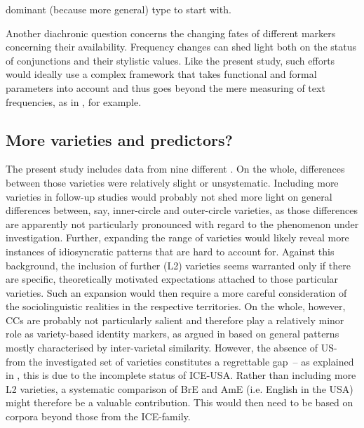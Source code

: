 dominant (because more general) type to start with.\largerpage

Another diachronic question concerns the changing fates of different markers concerning their availability. Frequency changes can shed light both on the  status of conjunctions and their stylistic values. Like the present study, such efforts would ideally use a complex framework that takes functional and formal parameters into account and thus goes beyond the mere measuring of text frequencies, as in \citet[165]{Schützler2018c}, for example.

\subsection{\label{bkm:Ref81829707}More varieties and predictors?}\label{sec:12.2.4}

The present study includes data from nine different . On the whole, differences between those varieties were relatively slight or unsystematic. Including more varieties in follow-up studies would probably not shed more light on general differences between, say, inner-circle and outer-circle varieties, as those differences are apparently not particularly pronounced with regard to the phenomenon under investigation. Further, expanding the range of varieties would likely reveal more instances of idiosyncratic patterns that are hard to account for. Against this background, the inclusion of further (L2) varieties seems warranted only if there are specific, theoretically motivated expectations attached to those particular varieties. Such an expansion would then require a more careful consideration of the sociolinguistic realities in the respective territories. On the whole, however, CCs are probably not particularly salient and therefore play a relatively minor role as variety-based identity markers, as argued in  based on general patterns mostly characterised by inter-varietal similarity. However, the absence of US- from the investigated set of varieties constitutes a regrettable gap~– as explained in , this is due to the incomplete status of ICE-USA. Rather than including more L2 varieties, a systematic comparison of BrE and AmE (i.e. English in the USA) might therefore be a valuable contribution. This would then need to be based on corpora beyond those from the ICE-family.

